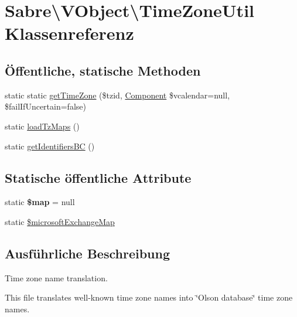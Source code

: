 \hypertarget{class_sabre_1_1_v_object_1_1_time_zone_util}{}\section{Sabre\textbackslash{}V\+Object\textbackslash{}Time\+Zone\+Util Klassenreferenz}
\label{class_sabre_1_1_v_object_1_1_time_zone_util}
\subsection*{Öffentliche, statische Methoden}
\begin{DoxyCompactItemize}
\item 
static static \mbox{\hyperlink{class_sabre_1_1_v_object_1_1_time_zone_util_a02b390e9e541b47def813c13964d5cd6}{get\+Time\+Zone}} (\$tzid, \mbox{\hyperlink{class_sabre_1_1_v_object_1_1_component}{Component}} \$vcalendar=null, \$fail\+If\+Uncertain=false)
\item 
static \mbox{\hyperlink{class_sabre_1_1_v_object_1_1_time_zone_util_a6458d5871069796f71115791bd1b8db8}{load\+Tz\+Maps}} ()
\item 
static \mbox{\hyperlink{class_sabre_1_1_v_object_1_1_time_zone_util_a81310986f7bd1b2db4b431aef6d0bc73}{get\+Identifiers\+BC}} ()
\end{DoxyCompactItemize}
\subsection*{Statische öffentliche Attribute}
\begin{DoxyCompactItemize}
\item 
\mbox{\label{class_sabre_1_1_v_object_1_1_time_zone_util_a460481190515f4248db4062cb1b0ba69}} 
static {\bfseries \$map} = null
\item 
static \mbox{\hyperlink{class_sabre_1_1_v_object_1_1_time_zone_util_a78c2a08411fd8f446b73081033fc89e3}{\$microsoft\+Exchange\+Map}}
\end{DoxyCompactItemize}


\subsection{Ausführliche Beschreibung}
Time zone name translation.

This file translates well-\/known time zone names into \char`\"{}\+Olson database\char`\"{} time zone names.

